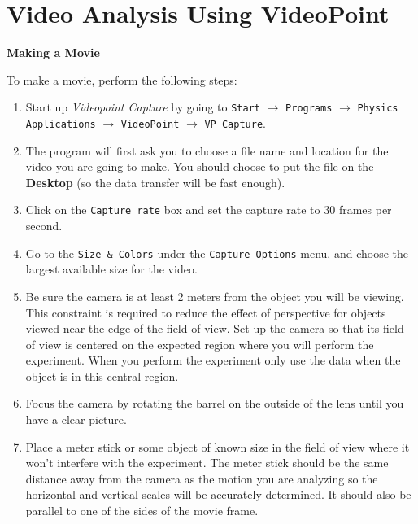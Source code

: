 
\section{Video Analysis Using VideoPoint}

\textbf{Making a Movie} 

To make a movie, perform the following steps:

\begin{enumerate}
\item Start up {\it Videopoint Capture} by
going to {\tt Start} $\rightarrow$ {\tt Programs} $\rightarrow$
{\tt Physics Applications} $\rightarrow$ {\tt VideoPoint}
$\rightarrow$ {\tt VP Capture}.
\item The program will first ask you to choose a file name and location for 
the video you are going to make.  You should choose to put the file on the 
\textbf{Desktop} (so the data transfer will be fast enough).

\item Click on the {\tt Capture rate}
box and set the capture rate to 30 frames per second.
\item Go to the {\tt Size \& Colors} under the {\tt Capture Options} 
menu, and choose the largest available size for the video.


\item Be sure the camera is at least 2 meters from the object
you will be viewing. This constraint is required to reduce the effect
of perspective for objects viewed near the edge of the field of view.
Set up the camera so that its field of view is centered on the expected
region where you will perform the experiment. 
When you perform the experiment only use the data when the object is in this central region.

\item Focus the camera by rotating the barrel on the outside
of the lens until you have a clear picture.

\item Place a meter stick or some
object of known size in the field of view where it won't interfere
with the experiment. The meter stick should be the same distance away from
the camera as the motion you are analyzing so the horizontal and vertical 
scales will be accurately determined. It should also be parallel to one of the
sides of the movie frame.


\end{enumerate}
